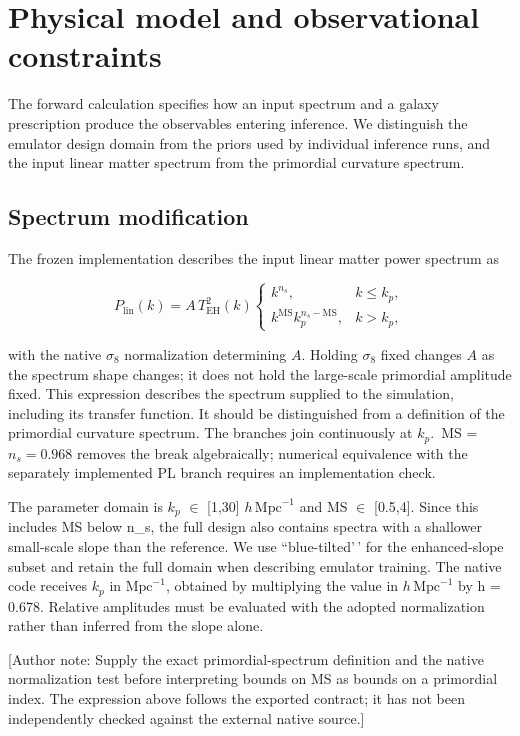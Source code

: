 \section{Physical model and observational constraints}\label{physical-model-and-simulations}

The forward calculation specifies how an input spectrum and a galaxy prescription produce the observables entering inference. We distinguish the emulator design domain from the priors used by individual inference runs, and the input linear matter spectrum from the primordial curvature spectrum.

\subsection{Spectrum modification}\label{spectrum-modification}

The frozen implementation describes the input linear matter power spectrum as

\[
P_{\mathrm{lin}}(k)=A\,T_{\mathrm{EH}}^2(k)
\begin{cases}
k^{n_s}, & k\leq k_p,\\
k^{\mathrm{MS}}k_p^{n_s-\mathrm{MS}}, & k>k_p,
\end{cases}
\]

with the native $\sigma_8$ normalization determining $A$. Holding $\sigma_8$ fixed changes $A$ as the spectrum shape changes; it does not hold the large-scale primordial amplitude fixed. This expression describes the spectrum supplied to the simulation, including its transfer function. It should be distinguished from a definition of the primordial curvature spectrum. The branches join continuously at \ensuremath{k_p}.~MS = $n_s=0.968$ removes the break algebraically; numerical equivalence with the separately implemented PL branch requires an implementation check.

The parameter domain is \ensuremath{k_p} \(\in\) {[}1,30{]} $h\,\mathrm{Mpc}^{-1}$ and MS \(\in\) {[}0.5,4{]}. Since this includes MS below n\_s, the full design also contains spectra with a shallower small-scale slope than the reference. We use ``blue-tilted'\,' for the enhanced-slope subset and retain the full domain when describing emulator training. The native code receives \ensuremath{k_p} in $\mathrm{Mpc}^{-1}$, obtained by multiplying the value in $h\,\mathrm{Mpc}^{-1}$ by h = 0.678. Relative amplitudes must be evaluated with the adopted normalization rather than inferred from the slope alone.

{[}Author note: Supply the exact primordial-spectrum definition and the native normalization test before interpreting bounds on MS as bounds on a primordial index. The expression above follows the exported contract; it has not been independently checked against the external native source.{]}

